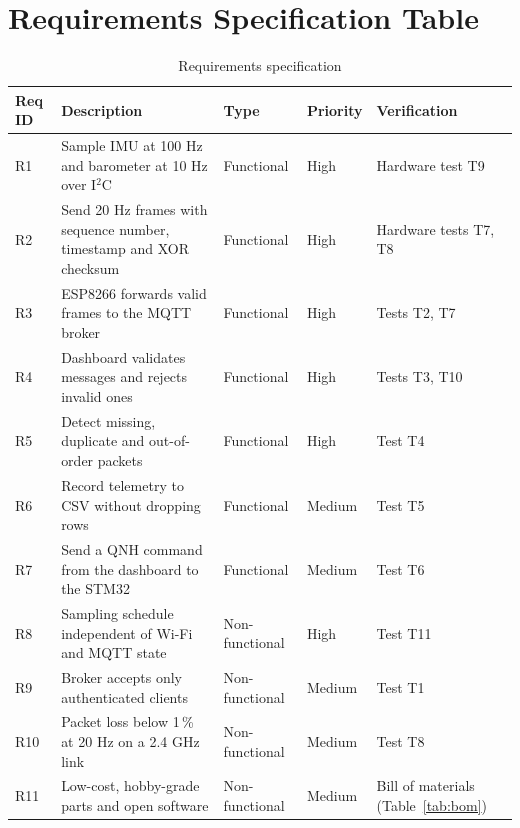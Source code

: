\documentclass[12pt,a4paper]{report}
\begin{document}
\section{Requirements Specification Table}
\begin{table}[htbp]
\centering
\caption{Requirements specification}
\label{tab:req}
\small
\begin{tabularx}{\textwidth}{lXllX}
\toprule
\textbf{Req ID} & \textbf{Description} & \textbf{Type} & \textbf{Priority} & \textbf{Verification}\\
\midrule
R1 & Sample IMU at 100 Hz and barometer at 10 Hz over I$^2$C & Functional & High & Hardware test T9\\
R2 & Send 20 Hz frames with sequence number, timestamp and XOR checksum & Functional & High & Hardware tests T7, T8\\
R3 & ESP8266 forwards valid frames to the MQTT broker & Functional & High & Tests T2, T7\\
R4 & Dashboard validates messages and rejects invalid ones & Functional & High & Tests T3, T10\\
R5 & Detect missing, duplicate and out-of-order packets & Functional & High & Test T4\\
R6 & Record telemetry to CSV without dropping rows & Functional & Medium & Test T5\\
R7 & Send a QNH command from the dashboard to the STM32 & Functional & Medium & Test T6\\
R8 & Sampling schedule independent of Wi-Fi and MQTT state & Non-functional & High & Test T11\\
R9 & Broker accepts only authenticated clients & Non-functional & Medium & Test T1\\
R10 & Packet loss below 1\,\% at 20 Hz on a 2.4 GHz link & Non-functional & Medium & Test T8\\
R11 & Low-cost, hobby-grade parts and open software & Non-functional & Medium & Bill of materials (Table~\ref{tab:bom})\\
\bottomrule
\end{tabularx}
\end{table}
\end{document}
